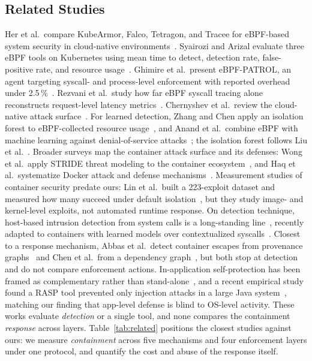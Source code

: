 \documentclass[10pt,conference]{IEEEtran}
\begin{document}
\subsection{Related Studies}
Her et al.\ compare KubeArmor, Falco, Tetragon, and Tracee for eBPF-based system security in cloud-native environments~\cite{her2025}. Syairozi and Arizal evaluate three eBPF tools on Kubernetes using mean time to detect, detection rate, false-positive rate, and resource usage~\cite{syairozi2025}. Ghimire et al.\ present eBPF-PATROL, an agent targeting syscall- and process-level enforcement with reported overhead under 2.5\,\%~\cite{ghimire2025}. Rezvani et al.\ study how far eBPF syscall tracing alone reconstructs request-level latency metrics~\cite{rezvani2024}. Chernyshev et al.\ review the cloud-native attack surface~\cite{chernyshev2021}. For learned detection, Zhang and Chen apply an isolation forest to eBPF-collected resource usage~\cite{zhang2023}, and Anand et al.\ combine eBPF with machine learning against denial-of-service attacks~\cite{anand2025}; the isolation forest follows Liu et al.~\cite{iforest}. Broader surveys map the container attack surface and its defenses: Wong et al.\ apply STRIDE threat modeling to the container ecosystem~\cite{wong2023}, and Haq et al.\ systematize Docker attack and defense mechanisms~\cite{haq2024}. Measurement studies of container security predate ours: Lin et al.\ built a 223-exploit dataset and measured how many succeed under default isolation~\cite{lin2018}, but they study image- and kernel-level exploits, not automated runtime response. On detection technique, host-based intrusion detection from system calls is a long-standing line~\cite{liu2018,bridges2019}, recently adapted to containers with learned models over contextualized syscalls~\cite{elkhairi2022}. Closest to a response mechanism, Abbas et al.\ detect container escapes from provenance graphs~\cite{abbas2022} and Chen et al.\ from a dependency graph~\cite{chen2024}, but both stop at detection and do not compare enforcement actions. In-application self-protection has been framed as complementary rather than stand-alone~\cite{cisar2016}, and a recent empirical study found a RASP tool prevented only injection attacks in a large Java system~\cite{seth2025}, matching our finding that app-level defense is blind to OS-level activity. These works evaluate \emph{detection} or a single tool, and none compares the containment \emph{response} across layers. Table~\ref{tab:related} positions the closest studies against ours: we measure \emph{containment} across five mechanisms and four enforcement layers under one protocol, and quantify the cost and abuse of the response itself.
\end{document}
